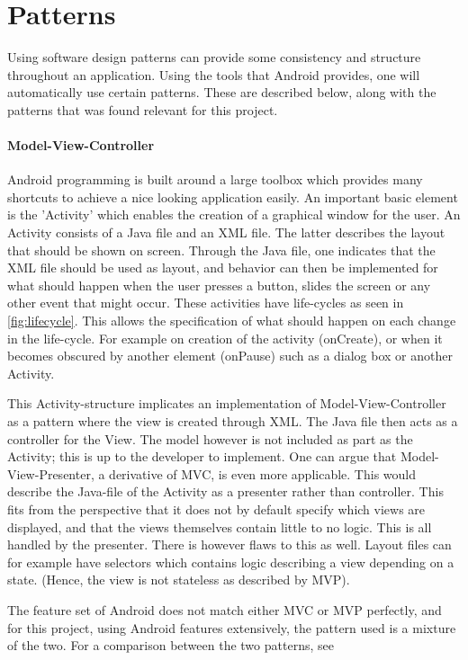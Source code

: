 \section{Patterns}
\label{sec:patterns}

Using software design patterns can provide some consistency and structure throughout an application. Using the tools that Android provides, one will automatically use certain patterns. These are described below, along with the patterns that was found relevant for this project.

\paragraph{Model-View-Controller}
Android programming is built around a large toolbox which provides many shortcuts to achieve a nice looking application easily. An important basic element is the 'Activity' which enables the creation of a graphical window for the user. An Activity consists of a Java file and an XML file. The latter describes the layout that should be shown on screen. Through the Java file, one indicates that the XML file should be used as layout, and behavior can then be implemented for what should happen when the user presses a button, slides the screen or any other event that might occur. These activities have life-cycles as seen in \ref{fig:lifecycle}. This allows the specification of what should happen on each change in the life-cycle. For example on creation of the activity (onCreate), or when it becomes obscured by another element (onPause) such as a dialog box or another Activity.

This Activity-structure implicates an implementation of Model-View-Controller as a pattern where the view is created through XML. The Java file then acts as a controller for the View. The model however is not included as part as the Activity; this is up to the developer to implement. One can argue that Model-View-Presenter, a derivative of MVC, is even more applicable. This would describe the Java-file of the Activity as a presenter rather than controller. This fits from the perspective that it does not by default specify which views are displayed, and that the views themselves contain little to no logic. This is all handled by the presenter. There is however flaws to this as well. Layout files can for example have selectors which contains logic describing a view depending on a state. (Hence, the view is not stateless as described by MVP).

The feature set of Android does not match either MVC or MVP perfectly, and for this project, using Android features extensively, the pattern used is a mixture of the two. For a comparison between the two patterns, see \citep{MVC_MVP}

